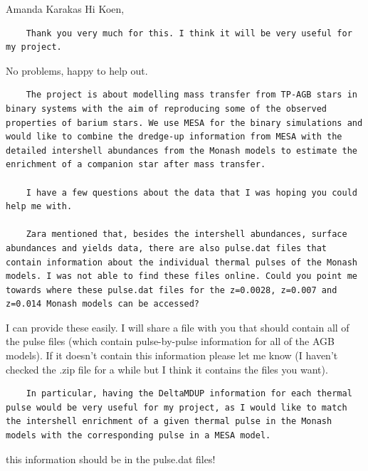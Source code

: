 \documentclass[a4paper,10pt]{article}
\begin{document}
\hspace{0.1\textwidth}\begin{minipage}{1.45\textwidth}
\begin{shadequote}{Amanda Karakas}
Hi Koen,

\begin{verbatim}
    Thank you very much for this. I think it will be very useful for my project.
\end{verbatim}


No problems, happy to help out.

\begin{verbatim}
    The project is about modelling mass transfer from TP-AGB stars in binary systems with the aim of reproducing some of the observed properties of barium stars. We use MESA for the binary simulations and would like to combine the dredge-up information from MESA with the detailed intershell abundances from the Monash models to estimate the enrichment of a companion star after mass transfer.

    I have a few questions about the data that I was hoping you could help me with.

    Zara mentioned that, besides the intershell abundances, surface abundances and yields data, there are also pulse.dat files that contain information about the individual thermal pulses of the Monash models. I was not able to find these files online. Could you point me towards where these pulse.dat files for the z=0.0028, z=0.007 and z=0.014 Monash models can be accessed?
\end{verbatim}

I can provide these easily. I will share a file with you that should contain all of the pulse files (which contain pulse-by-pulse information for all of the AGB models).
If it doesn't contain this information please let me know (I haven't checked the .zip file for a while but I think it contains the files you want).

\begin{verbatim}
    In particular, having the DeltaMDUP information for each thermal pulse would be very useful for my project, as I would like to match the intershell enrichment of a given thermal pulse in the Monash models with the corresponding pulse in a MESA model.
\end{verbatim}

this information should be in the pulse.dat files!
 

\end{shadequote}
\end{minipage}
\end{document}
